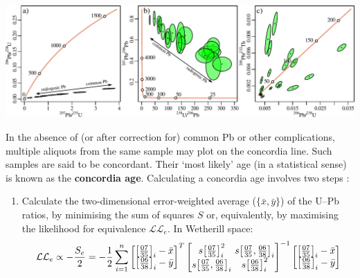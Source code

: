 \begin{refsection}
\noindent\includegraphics[width=\textwidth]{../figures/3xconcordia.pdf}
\begingroup {}\endgroup

In the absence of (or after correction for) common Pb or other
complications, multiple aliquots from the same sample may plot on the
concordia line. Such samples are said to be concordant. Their `most
likely' age (in a statistical sense) is known as the \textbf{concordia
  age}. Calculating a concordia age involves two steps
\citep{ludwig1998}:

\begin{enumerate}
  \item Calculate the two-dimensional error-weighted average
    ($\{\bar{x},\bar{y}\}$) of the U--Pb ratios, by minimising the sum
    of squares $S$ or, equivalently, by maximising the likelihood for
    equivalence 
    $\mathcal{LL}_e$. In Wetherill space:
    \begin{equation}
      \mathcal{LL}_e \propto - \frac{S_e}{2} =
      -\frac{1}{2}\sum\limits_{i=1}^{n} \left[
      \begin{array}{@{}c@{}}
        \left[\frac{07}{35}\right]_i-\bar{x}\\
        \left[\frac{06}{38}\right]_i-\bar{y}
      \end{array}
      \right]^T
    \left[
      \begin{array}{@{}c@{~}c@{}}
        s\!\left[\frac{07}{35}\right]_i^2 &
        s\!\left[\frac{07}{35},\frac{06}{38}\right]_i\\
        s\!\left[\frac{07}{35},\frac{06}{38}\right]_i &
        s\!\left[\frac{06}{38}\right]_i^2
      \end{array}
      \right]^{-1}
    \left[
      \begin{array}{@{}c@{}}
        \left[\frac{07}{35}\right]_i-\bar{x}\\
        \left[\frac{06}{38}\right]_i-\bar{y}
      \end{array}
      \right]    
    \end{equation}


\end{enumerate}
\end{refsection}
